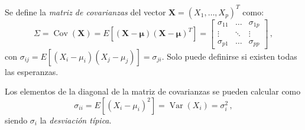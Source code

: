 \begin{ndef}
  Se define la \textit{matriz de covarianzas} del vector $\boldsymbol X = (X_1,\dots,X_p)^T$ como:
  \[
\Sigma = \operatorname{Cov}(\boldsymbol X) = E\left[(\boldsymbol X-\boldsymbol \mu)(\boldsymbol X-\boldsymbol \mu)^T\right] = \begin{bmatrix} \sigma_{11} & \dots & \sigma_{1p} \\ \vdots& \ddots & \vdots \\ \sigma_{p1} &  \dots & \sigma_{pp}\end{bmatrix}\,,
\]
con $\sigma_{ij} = E\left[(X_i - \mu_i)(X_j - \mu_j)\right] = \sigma_{ji}$. Solo puede definirse si existen todas las esperanzas. 
\end{ndef}

\begin{nota}
  Los elementos de la diagonal de la matriz de covarianzas se pueden calcular como \[\sigma_{ii}=E\left[(X_i - \mu_i)^2\right] = \operatorname{Var}(X_i) = \sigma_i^2\,,\]siendo $\sigma_i$ la \textit{desviación típica}.
\end{nota}

